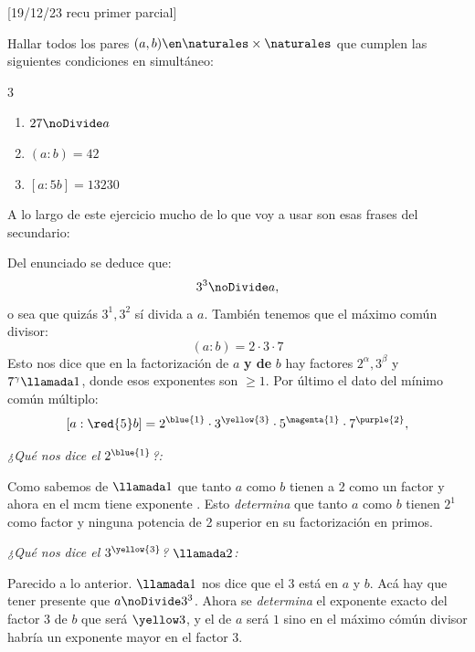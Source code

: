 \begin{enunciado}{}
  [19/12/23 recu primer parcial]

  Hallar todos los pares $(a,b) \en \naturales \times \naturales$ que cumplen las siguientes condiciones en simultáneo:
  \begin{multicols}{3}
    \begin{enumerate}[label=]
      \item $27 \noDivide a$
      \item $(a:b) = 42$
      \item $[a:5b] = 13230$
    \end{enumerate}
  \end{multicols}
\end{enunciado}

A lo largo de este ejercicio mucho de lo que voy a usar son esas frases del secundario:


\bigskip

Del enunciado se deduce que:
$$
  3^3 \noDivide a,
$$
o sea que quizás $3^1,3^2$ sí divida a $a$. También tenemos que el máximo común divisor:
$$
  (a:b) = 2 \cdot 3 \cdot 7
$$
Esto nos dice que en la factorización de $a$ \textbf{y de} $b$ hay factores $2^\alpha, 3^\beta$ y $7^\gamma \llamada1$, donde esos exponentes son $\geq 1$.
Por último el dato del mínimo común múltiplo:
$$
  [a:\red{5}b] = 2^{\blue{1}} \cdot 3^{\yellow{3}} \cdot 5^{\magenta{1}} \cdot 7^{\purple{2}},
$$

\textit{¿Qué nos dice el $2^{\blue{1}}$?:}\par
Como sabemos de $\llamada1$ que tanto $a$ como $b$ tienen a 2 como un factor y ahora en el mcm tiene exponente . Esto
\textit{determina} que tanto $a$ como $b$ tienen $2^1$ como factor y ninguna potencia de 2 superior en su factorización en primos.

\bigskip

\textit{¿Qué nos dice el $3^{\yellow{3}}$? $\llamada2$:}\par
Parecido a lo anterior. $\llamada1$ nos dice que el 3 está en $a$ y $b$. Acá hay que tener presente que $a \noDivide 3^3$.
Ahora se \textit{determina} el exponente exacto del factor 3 de $b$ que será $\yellow3$, y el de $a$ será $1$ sino en el máximo cómún divisor
habría un exponente mayor en el factor 3.

